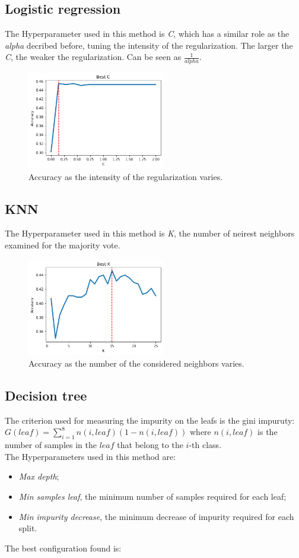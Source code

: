 \documentclass[10pt,twocolumn,letterpaper]{article}
\begin{document}
\subsection{Logistic regression}
The Hyperparameter used in this method is \textit{C}, which has a similar role as the \textit{alpha} decribed before, tuning the intensity of the regularization. The larger the \textit{C}, the weaker the regularization. Can be seen as $\frac{1}{alpha}$.
\begin{figure}[h!]
	\centering
	\includegraphics[width=6cm]{LR.png}
	\caption{Accuracy as the intensity of the regularization varies.}
	\label{LR.png}
\end{figure}
\medskip

\subsection{KNN}
The Hyperparameter used in this method is \textit{K}, the number of neirest neighbors examined for the majority vote.
\begin{figure}[h!]
	\centering
	\includegraphics[width=6cm]{KNN.png}
	\caption{Accuracy as the number of the considered neighbors varies.}
	\label{KNN.png}
\end{figure}
\medskip

\subsection{Decision tree}
The criterion used for measuring the impurity on the leafs is the gini impuruty:\\ $G(leaf) = \sum_{i = 1}^{8}n(i, leaf) (1 - n(i, leaf)) $ where $n(i, leaf)$ is the number of samples in the $leaf$ that belong to the $i$-th class. \\The Hyperparameters used in this method are:
\begin{itemize}
	\item \textit{Max depth};
	\item \textit{Min samples leaf}, the minimum number of samples required for each leaf;
	\item \textit{Min impurity decrease}, the minimum decrease of impurity required for each split.
\end{itemize}
The best configuration found is:
\end{document}
